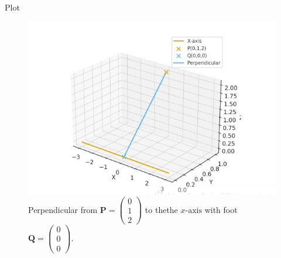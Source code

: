\documentclass{beamer}
\theoremstyle{remark}
\newcommand{\myvec}[1]{\ensuremath{\begin{pmatrix}#1\end{pmatrix}}}
\let\vec\mathbf
\begin{document}
\begin{frame}{Plot}
    \begin{figure}[H]
    \centering
    \includegraphics[width=0.75\linewidth]{figs/matgeo-4.8.35.jpeg}
    \caption{Perpendicular from $\vec{P}=\myvec{0\\1\\2}$ to thethe $x\text{-axis}$
 with foot $\vec{Q}=\myvec{0\\0\\0}$.}
    \label{fig:4.8.35-3d}
\end{figure}
\end{frame}
\end{document}
